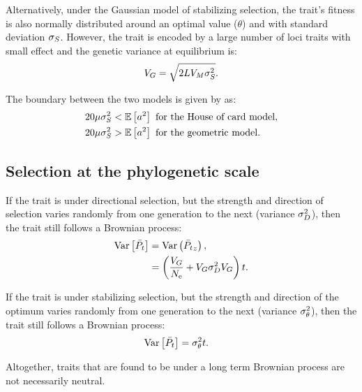 \documentclass{article}
\begin{document}
    Alternatively, under the Gaussian model of stabilizing selection\cite{lande_natural_1976}, the trait's fitness is also normally distributed around an optimal value ($\theta$) and with standard deviation $\sigma_S$.
    However, the trait is encoded by a large number of loci traits with small effect and the genetic variance at equilibrium is:
    \begin{gather}
        V_{G} = \sqrt{2 L V_{M} \sigma^2_S} \label{eq-mutsel-G}.
    \end{gather}

    The boundary between the two models is given by \textcite{turelli_heritable_1984} as:
    \begin{align}
        20 \mu \sigma^2_S &< \operatorname{\mathbb{E}} \left[ a^2 \right] \text{ for the House of card model}, \\
        20 \mu \sigma^2_S &> \operatorname{\mathbb{E}} \left[ a^2 \right] \text{ for the geometric model}.
    \end{align}

    \subsection{Selection at the phylogenetic scale}
    If the trait is under directional selection, but the strength and direction of selection varies randomly from one generation to the next (variance $\sigma^2_D$), then the trait still follows a Brownian process:
    \begin{align}
        \operatorname{\text{Var}} \left[\bar{P_{t}}\right] &= \operatorname{\text{Var}} \left( \bar{P_{t}}_z \right), \\
        &= \left(\frac{V_{G}}{N_{\text{e}}} + V_{G} \sigma^2_D V_{G} \right) t. \label{eq-selection-vary-direct}
    \end{align}

    If the trait is under stabilizing selection, but the strength and direction of the optimum varies randomly from one generation to the next (variance $\sigma^2_{\theta}$), then the trait still follows a Brownian process:
    \begin{align}
        \operatorname{\text{Var}} \left[\bar{P_{t}}\right] &= \sigma^2_{\theta} t. \label{eq-selection-vary-stabi}
    \end{align}

    Altogether, traits that are found to be under a long term Brownian process are not necessarily neutral.

    \printbibliography
\end{document}
